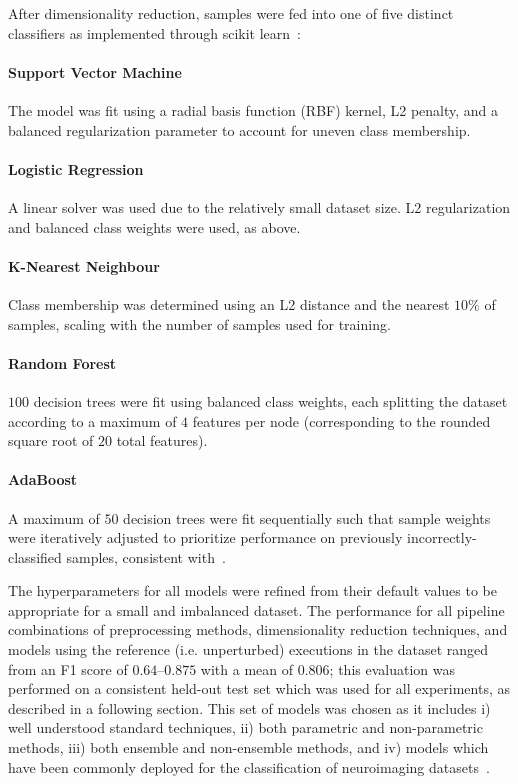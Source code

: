 \documentclass[10pt]{SelfArx} %
\begin{document}
After dimensionality reduction, samples were fed into one of five distinct classifiers as implemented through scikit
learn~\cite{Pedregosa2011-uz}:

\paragraph{Support Vector Machine} The model was fit using a radial basis function (RBF) kernel, L2 penalty, and a
balanced regularization parameter to account for uneven class membership.

\paragraph{Logistic Regression} A linear solver was used due to the relatively small dataset size. L2 regularization
and balanced class weights were used, as above.

\paragraph{K-Nearest Neighbour} Class membership was determined using an L2 distance and the nearest $10\%$ of
samples, scaling with the number of samples used for training.

\paragraph{Random Forest} $100$ decision trees were fit using balanced class weights, each splitting the dataset
according to a maximum of $4$ features per node (corresponding to the rounded square root of $20$ total features).

\paragraph{AdaBoost} A maximum of $50$ decision trees were fit sequentially such that sample weights were iteratively
adjusted to prioritize performance on previously incorrectly-classified samples, consistent with~\cite{Freund1997-qy}.

The hyperparameters for all models were refined from their default values to be appropriate for a small and imbalanced
dataset. The performance for all pipeline combinations of preprocessing methods, dimensionality reduction techniques,
and models using the reference (i.e. unperturbed) executions in the dataset ranged from an F1 score of $0.64 – 0.875$
with a mean of $0.806$; this evaluation was performed on a consistent held-out test set which was used for all
experiments, as described in a following section. This set of models was chosen as it includes i) well understood
standard techniques, ii) both parametric and non-parametric methods, iii) both ensemble and non-ensemble
methods, and iv) models which have been commonly deployed for the classification of neuroimaging
datasets~\cite{Meier2012-ve,Tunc2016-cz,Zhu2018-cs,Payabvash2019-tm,Crossley2014-tg,Park2015-uj,Nayak2016-wl,Tolan2018-nq}.
\end{document}
